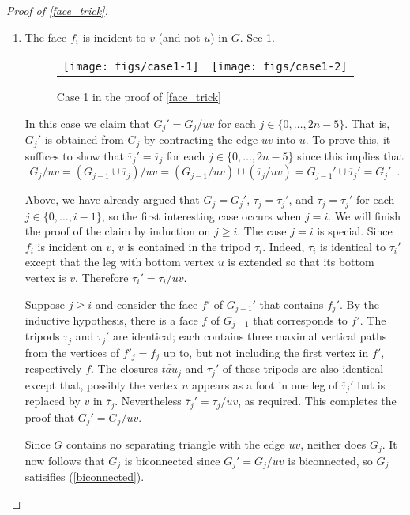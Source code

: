 \documentclass{patmorin}
\begin{document}
\begin{proof}[Proof of \cref{face_trick}]
  \begin{enumerate}
    \item The face $f_i$ is incident to $v$ (and not $u$) in $G$. See \cref{replacement}.  
    \begin{figure}
      \begin{center}
        \begin{tabular}{cc}
          \texttt{[image: figs/case1-1]} & \texttt{[image: figs/case1-2]}
        \end{tabular}
      \end{center}
      \caption{Case 1 in the proof of \cref{face_trick}}
      \label{replacement}
    \end{figure}

    In this case we claim that $G_j'=G_j/uv$ for each $j\in\{0,\ldots,2n-5\}$. That is, $G_j'$ is obtained from $G_j$ by contracting the edge $uv$ into $u$.  To prove this, it suffices to show that $\overline{\tau}_j'=\overline{\tau}_j$ for each $j\in\{0,\ldots,2n-5\}$ since this implies that
    \[  
      G_j/uv = (G_{j-1}\cup\overline{\tau}_j)/uv=(G_{j-1}/uv) \cup (\overline{\tau}_j/uv) = G_{j-1}'\cup \overline{\tau}_j' = G_j' \enspace . 
    \]
      
    Above, we have already argued that $G_j=G_j'$, $\tau_j=\tau_j'$, and $\overline{\tau}_j=\overline{\tau}_j'$ for each $j\in\{0,\ldots,i-1\}$, so the first interesting case occurs when $j=i$.  We will finish the proof of the claim by induction on $j\ge i$. The case $j=i$ is special.  Since $f_i$ is incident on $v$, $v$ is contained in the tripod $\tau_i$.  Indeed, $\tau_i$ is identical to $\tau_i'$ except that the leg with bottom vertex $u$ is extended so that its bottom vertex is $v$. Therefore $\tau_i'=\tau_i/uv$.

    Suppose $j\ge i$ and consider the face $f'$ of $G_{j-1}'$ that contains $f_j'$.  By the inductive hypothesis, there is a face $f$ of $G_{j-1}$ that corresponds to $f'$. The tripods $\tau_j$ and $\tau_j'$ are identical; each contains three maximal vertical paths from the vertices of $f'_j=f_j$ up to, but not including the first vertex in $f'$, respectively $f$.  The closures $\overline{tau}_j$ and $\overline{\tau}_j'$ of these tripods are also identical except that, possibly the vertex $u$ appears as a foot in one leg of $\overline{\tau}_j'$ but is replaced by $v$ in $\overline{\tau}_j$.  Nevertheless $\overline{\tau}_j'=\tau_j/uv$, as required.  This completes the proof that $G_j'=G_j/uv$.

    Since $G$ contains no separating triangle with the edge $uv$, neither does $G_j$.  It now follows that $G_j$ is biconnected since $G_j'=G_j/uv$ is biconnected, so $G_j$ satisifies (\ref{biconnected}).
    

\end{enumerate}
\end{proof}
\end{document}
